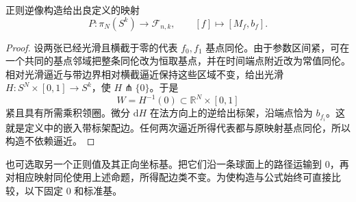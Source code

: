 \begin{proposition}\label{g2:prop:regular-fiber-framed-homotopy}
	正则逆像构造给出良定义的映射
	\[
		P:\pi_N(S^k)\longrightarrow\mathcal F_{n,k},\qquad
		[f]\longmapsto[M_f,b_f].
	\]
\end{proposition}
\begin{proof}
	设两张已经光滑且横截于零的代表 \(f_0,f_1\) 基点同伦。由于参数区间紧，可在一个共同的基点邻域把整条同伦改为恒取基点，并在时间端点附近改为常值同伦。相对光滑逼近与带边界相对横截逼近保持这些区域不变，给出光滑 \(H:S^N\times[0,1]\to S^k\)，使 \(H\pitchfork\{0\}\)。于是
	\[
		W=H^{-1}(0)\subset\mathbb R^N\times[0,1]
	\]
	紧且具有所需乘积领圈。微分 \(\mathrm dH\) 在法方向上的逆给出标架，沿端点恰为 \(b_{f_i}\)。这就是定义中的嵌入带标架配边。任何两次逼近所得代表都与原映射基点同伦，所以构造不依赖逼近。
\end{proof}

也可选取另一个正则值及其正向坐标基。把它们沿一条球面上的路径运输到 \(0\)，再对相应映射同伦使用上述命题，所得配边类不变。为使构造与公式始终可直接比较，以下固定 \(0\) 和标准基。

